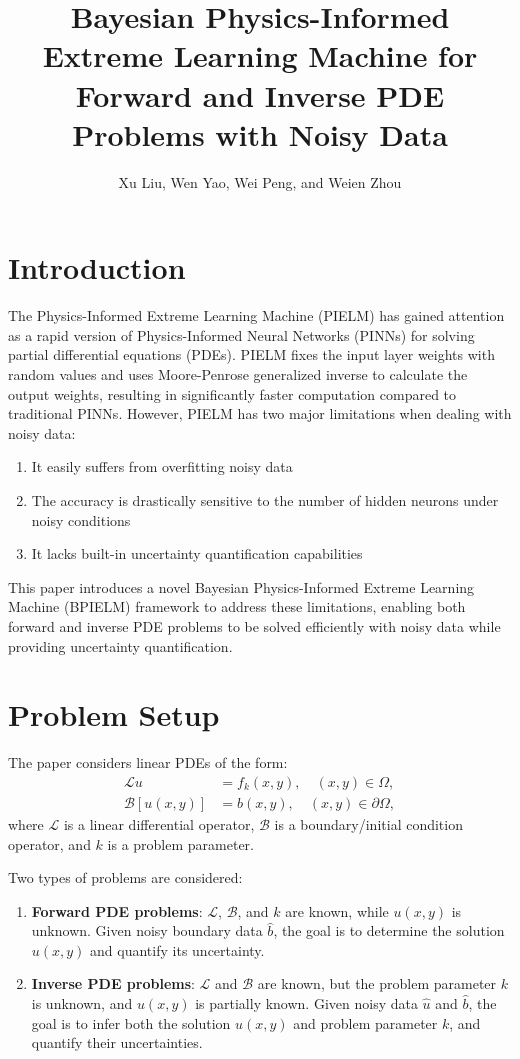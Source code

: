 \documentclass[11pt]{article}
\title{Bayesian Physics-Informed Extreme Learning Machine for Forward and Inverse PDE Problems with Noisy Data}
\author{Xu Liu, Wen Yao, Wei Peng, and Weien Zhou}
\date{}
\begin{document}
\maketitle

\section{Introduction}

The Physics-Informed Extreme Learning Machine (PIELM) has gained attention as a rapid version of Physics-Informed Neural Networks (PINNs) for solving partial differential equations (PDEs). PIELM fixes the input layer weights with random values and uses Moore-Penrose generalized inverse to calculate the output weights, resulting in significantly faster computation compared to traditional PINNs. However, PIELM has two major limitations when dealing with noisy data:

\begin{enumerate}
    \item It easily suffers from overfitting noisy data
    \item The accuracy is drastically sensitive to the number of hidden neurons under noisy conditions
    \item It lacks built-in uncertainty quantification capabilities
\end{enumerate}

This paper introduces a novel Bayesian Physics-Informed Extreme Learning Machine (BPIELM) framework to address these limitations, enabling both forward and inverse PDE problems to be solved efficiently with noisy data while providing uncertainty quantification.

\section{Problem Setup}

The paper considers linear PDEs of the form:
\begin{align}
    \mathcal{L}u &= f_k(x,y), \quad (x,y) \in \Omega, \\
    \mathcal{B}[u(x,y)] &= b(x,y), \quad (x,y) \in \partial\Omega,
\end{align}
where $\mathcal{L}$ is a linear differential operator, $\mathcal{B}$ is a boundary/initial condition operator, and $k$ is a problem parameter.

Two types of problems are considered:

\begin{enumerate}
    \item \textbf{Forward PDE problems}: $\mathcal{L}$, $\mathcal{B}$, and $k$ are known, while $u(x,y)$ is unknown. Given noisy boundary data $\hat{b}$, the goal is to determine the solution $u(x,y)$ and quantify its uncertainty.
    
    \item \textbf{Inverse PDE problems}: $\mathcal{L}$ and $\mathcal{B}$ are known, but the problem parameter $k$ is unknown, and $u(x,y)$ is partially known. Given noisy data $\hat{u}$ and $\hat{b}$, the goal is to infer both the solution $u(x,y)$ and problem parameter $k$, and quantify their uncertainties.
\end{enumerate}
\end{document}

